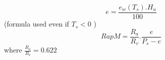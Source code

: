 \[
e = \frac{e_w(T_s) . H_u}{100} 
\]
(formula used even if $T_s < 0$ )
\[
RapM = \frac{R_a}{R_v}.
       \frac{e} 
            {P_s - e }
\]
where $\frac{R_a}{R_v} = 0.622$ 
